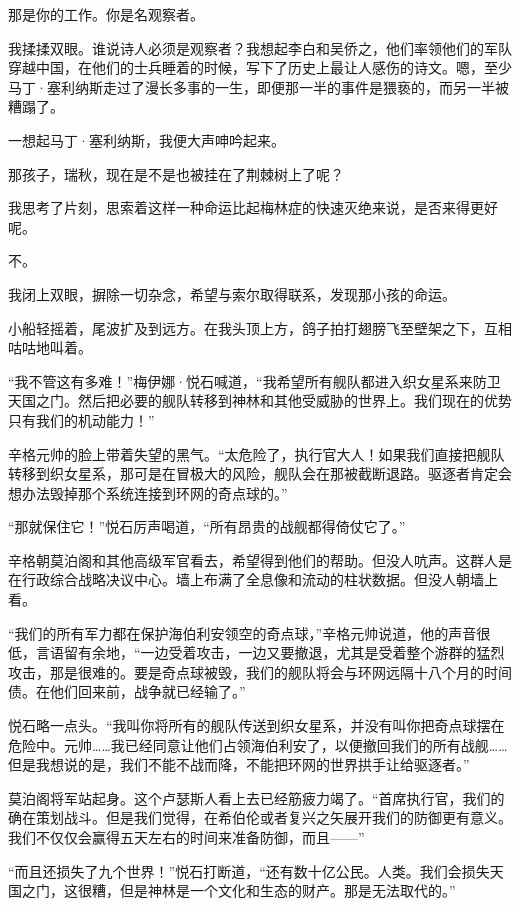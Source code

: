 \documentclass[AutoFakeBold=true]{book}
\begin{document}
{\kaishu 那是你的工作。你是名观察者。}

我揉揉双眼。谁说诗人必须是观察者？我想起李白和吴侨之，他们率领他们的军队穿越中国，在他们的士兵睡着的时候，写下了历史上最让人感伤的诗文。嗯，至少马丁·塞利纳斯走过了漫长多事的一生，即便那一半的事件是猥亵的，而另一半被糟蹋了。

一想起马丁·塞利纳斯，我便大声呻吟起来。

{\kaishu 那孩子，瑞秋，现在是不是也被挂在了荆棘树上了呢？}

我思考了片刻，思索着这样一种命运比起梅林症的快速灭绝来说，是否来得更好呢。

{\kaishu 不。}

我闭上双眼，摒除一切杂念，希望与索尔取得联系，发现那小孩的命运。

小船轻摇着，尾波扩及到远方。在我头顶上方，鸽子拍打翅膀飞至壁架之下，互相咕咕地叫着。

\vspace*{1em}

``我不管这有多难！''梅伊娜·悦石喊道，``我希望所有舰队都进入织女星系来防卫天国之门。然后把必要的舰队转移到神林和其他受威胁的世界上。我们现在的优势只有我们的机动能力！''

辛格元帅的脸上带着失望的黑气。``太危险了，执行官大人！如果我们直接把舰队转移到织女星系，那可是在冒极大的风险，舰队会在那被截断退路。驱逐者肯定会想办法毁掉那个系统连接到环网的奇点球的。''

``那就保住它！''悦石厉声喝道，``所有昂贵的战舰都得倚仗它了。''

辛格朝莫泊阁和其他高级军官看去，希望得到他们的帮助。但没人吭声。这群人是在行政综合战略决议中心。墙上布满了全息像和流动的柱状数据。但没人朝墙上看。

``我们的所有军力都在保护海伯利安领空的奇点球，''辛格元帅说道，他的声音很低，言语留有余地，``一边受着攻击，一边又要撤退，尤其是受着整个游群的猛烈攻击，那是很难的。要是奇点球被毁，我们的舰队将会与环网远隔十八个月的时间债。在他们回来前，战争就已经输了。''

悦石略一点头。``我叫你将所有的舰队传送到织女星系，并没有叫你把奇点球摆在危险中。元帅……我已经同意让他们占领海伯利安了，以便撤回我们的所有战舰……但是我想说的是，我们不能不战而降，不能把环网的世界拱手让给驱逐者。''

莫泊阁将军站起身。这个卢瑟斯人看上去已经筋疲力竭了。``首席执行官，我们的确在策划战斗。但是我们觉得，在希伯伦或者复兴之矢展开我们的防御更有意义。我们不仅仅会赢得五天左右的时间来准备防御，而且——''

``而且还损失了九个世界！''悦石打断道，``还有数十亿公民。人类。我们会损失天国之门，这很糟，但是神林是一个文化和生态的财产。那是无法取代的。''
\end{document}
